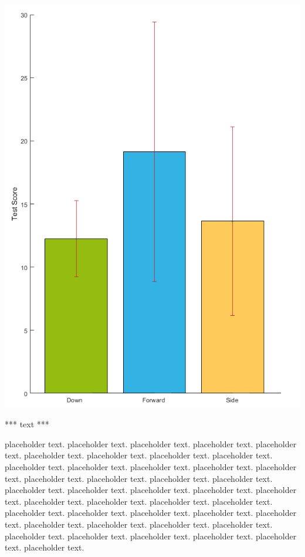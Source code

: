 \documentclass[landscape,a0paper,fontscale=0.375]{baposter} %
\begin{document}
\begin{poster}
{\begin{multicols}{2}
\begin{center}
	\includegraphics[width=0.3\linewidth]{TestScore}
\end{center}

*** text ***

\end{multicols}

placeholder text. placeholder text. placeholder text. placeholder text. placeholder text. placeholder text. placeholder text. placeholder text. placeholder text. placeholder text. placeholder text. placeholder text. placeholder text. placeholder text. placeholder text. placeholder text. placeholder text. placeholder text. placeholder text. placeholder text. placeholder text. placeholder text. placeholder text. placeholder text. placeholder text. placeholder text. placeholder text. placeholder text. placeholder text. placeholder text. placeholder text. placeholder text. placeholder text. placeholder text. placeholder text. placeholder text. placeholder text. placeholder text. placeholder text. placeholder text. placeholder text. placeholder text. 

%
%
% 
}


\end{poster}
\end{document}
